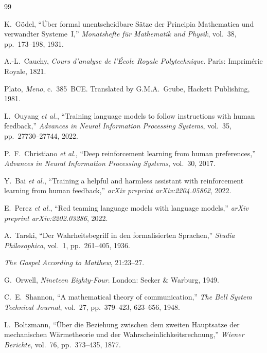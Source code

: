 \documentclass[11pt,a4paper]{article}
\theoremstyle{definition}
\theoremstyle{plain}
\theoremstyle{remark}
\begin{document}
\begin{thebibliography}{99}

K.~G\"{o}del, ``\"{U}ber formal unentscheidbare S\"{a}tze der Principia Mathematica und verwandter Systeme~I,'' \textit{Monatshefte f\"{u}r Mathematik und Physik}, vol.~38, pp.~173--198, 1931.

A.-L.~Cauchy, \textit{Cours d'analyse de l'\'{E}cole Royale Polytechnique}. Paris: Imprim\'{e}rie Royale, 1821.

Plato, \textit{Meno}, c.~385~BCE. Translated by G.M.A.~Grube, Hackett Publishing, 1981.

L.~Ouyang \textit{et al.}, ``Training language models to follow instructions with human feedback,'' \textit{Advances in Neural Information Processing Systems}, vol.~35, pp.~27730--27744, 2022.

P.~F.~Christiano \textit{et al.}, ``Deep reinforcement learning from human preferences,'' \textit{Advances in Neural Information Processing Systems}, vol.~30, 2017.

Y.~Bai \textit{et al.}, ``Training a helpful and harmless assistant with reinforcement learning from human feedback,'' \textit{arXiv preprint arXiv:2204.05862}, 2022.

E.~Perez \textit{et al.}, ``Red teaming language models with language models,'' \textit{arXiv preprint arXiv:2202.03286}, 2022.

A.~Tarski, ``Der Wahrheitsbegriff in den formalisierten Sprachen,'' \textit{Studia Philosophica}, vol.~1, pp.~261--405, 1936.

\textit{The Gospel According to Matthew}, 21:23--27.

G.~Orwell, \textit{Nineteen Eighty-Four}. London: Secker \& Warburg, 1949.

C.~E.~Shannon, ``A mathematical theory of communication,'' \textit{The Bell System Technical Journal}, vol.~27, pp.~379--423, 623--656, 1948.

L.~Boltzmann, ``\"{U}ber die Beziehung zwischen dem zweiten Hauptsatze der mechanischen W\"{a}rmetheorie und der Wahrscheinlichkeitsrechnung,'' \textit{Wiener Berichte}, vol.~76, pp.~373--435, 1877.


\end{thebibliography}
\end{document}
